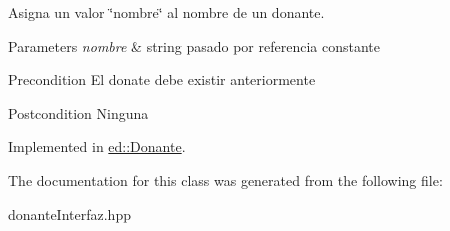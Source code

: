 Asigna un valor \char`\"{}nombre\char`\"{} al nombre de un donante. 


\begin{DoxyParams}{Parameters}
{\em nombre} & string pasado por referencia constante \\
\hline
\end{DoxyParams}
\begin{DoxyPrecond}{Precondition}
El donate debe existir anteriormente 
\end{DoxyPrecond}
\begin{DoxyPostcond}{Postcondition}
Ninguna 
\end{DoxyPostcond}


Implemented in \hyperlink{classed_1_1Donante_a346b31e40b478d25c3e311de2ff2fb2c}{ed\-::\-Donante}.



The documentation for this class was generated from the following file\-:\begin{DoxyCompactItemize}
\item 
donante\-Interfaz.\-hpp\end{DoxyCompactItemize}
